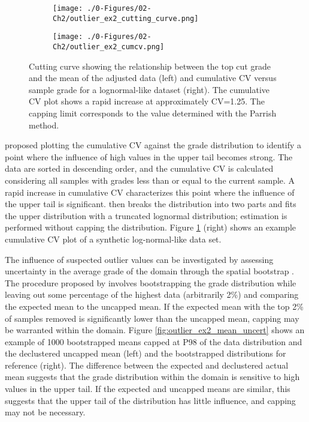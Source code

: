 \begin{figure}[!htb]
    \begin{subfigure}{0.5\textwidth}
        \centering
        \texttt{[image: ./0-Figures/02-Ch2/outlier\_ex2\_cutting\_curve.png]}
    \end{subfigure}
    \begin{subfigure}{0.5\textwidth}
        \centering
        \texttt{[image: ./0-Figures/02-Ch2/outlier\_ex2\_cumcv.png]}
    \end{subfigure}
    \caption{Cutting curve showing the relationship between the top cut grade and the mean of the adjusted data (left) and cumulative \gls{CV} versus sample grade for a lognormal-like dataset (right). The cumulative \gls{CV} plot shows a rapid increase at approximately CV=1.25. The capping limit corresponds to the value determined with the Parrish method.}
    \label{fig:cutting_cv}
\end{figure}

\cite{parker1991statistical} proposed plotting the cumulative \gls{CV} against the grade distribution to identify a point where the influence of high values in the upper tail becomes strong. The data are sorted in descending order, and the cumulative \gls{CV} is calculated considering all samples with grades less than or equal to the current sample. A rapid increase in cumulative \gls{CV} characterizes this point where the influence of the upper tail is significant. \cite{parker1991statistical} then breaks the distribution into two parts and fits the upper distribution with a truncated lognormal distribution; estimation is performed without capping the distribution. Figure \ref{fig:cutting_cv} (right) shows an example cumulative \gls{CV} plot of a synthetic log-normal-like data set.

The influence of suspected outlier values can be investigated by assessing uncertainty in the average grade of the domain through the spatial bootstrap \citep{solow1985bootstrapping}. The procedure proposed by \cite{nowak2013suggestions} involves bootstrapping the grade distribution while leaving out some percentage of the highest data (arbitrarily 2\%) and comparing the expected mean to the uncapped mean. If the expected mean with the top 2\% of samples removed is significantly lower than the uncapped mean, capping may be warranted within the domain. Figure \ref{fig:outlier_ex2_mean_uncert} shows an example of 1000 bootstrapped means capped at P98 of the data distribution and the declustered uncapped mean (left) and the bootstrapped distributions for reference (right). The difference between the expected and declustered actual mean suggests that the grade distribution within the domain is sensitive to high values in the upper tail. If the expected and uncapped means are similar, this suggests that the upper tail of the distribution has little influence, and capping may not be necessary.

